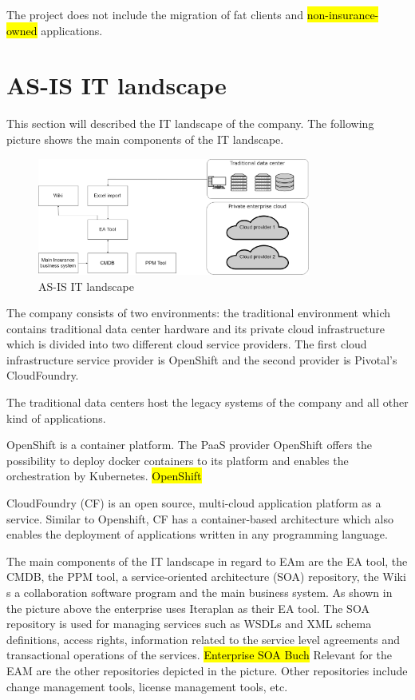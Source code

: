 The project does not include the migration of fat clients and \hl{non-insurance-owned} applications.

\section{AS-IS IT landscape}\label{section:asislandscape}

This section will described the IT landscape of the company. The following picture shows the main components of the IT landscape.

\begin{figure}[htpb]
  \centering
  \includegraphics[width=0.8\textwidth]{figures/as-is-it-landscape.png}
  \caption{ AS-IS IT landscape~\parencite{Corpancho Villasana 2018}}
  \label{fig:AS-IS IT landscape}
\end{figure}

The company consists of two environments: the traditional environment which contains traditional data center hardware and its private cloud infrastructure which is divided into two different cloud service providers. The first cloud infrastructure service provider is OpenShift and the second provider is Pivotal's CloudFoundry.

The traditional data centers host the legacy systems of the company and all other kind of applications.

OpenShift is a container platform. The PaaS provider OpenShift offers the possibility to deploy docker containers to its platform and enables the orchestration by Kubernetes. \hl{OpenShift}

CloudFoundry (CF) is an open source, multi-cloud application platform as a service. Similar to Openshift, CF has a container-based architecture which also enables the deployment of applications written in any programming language.

The main components of the IT landscape in regard to EAm are the EA tool, the CMDB, the PPM tool, a service-oriented architecture (SOA) repository, the Wiki s a collaboration software program and the main business system. As shown in the picture above the enterprise uses Iteraplan as their EA tool. %
The SOA repository is used for managing services such as WSDLs and XML schema definitions, access rights, information related to the service level agreements and transactional operations of the services. \hl{Enterprise SOA Buch} 
Relevant for the EAM are the other repositories depicted in the picture. Other repositories include change management tools, license management tools, etc.

